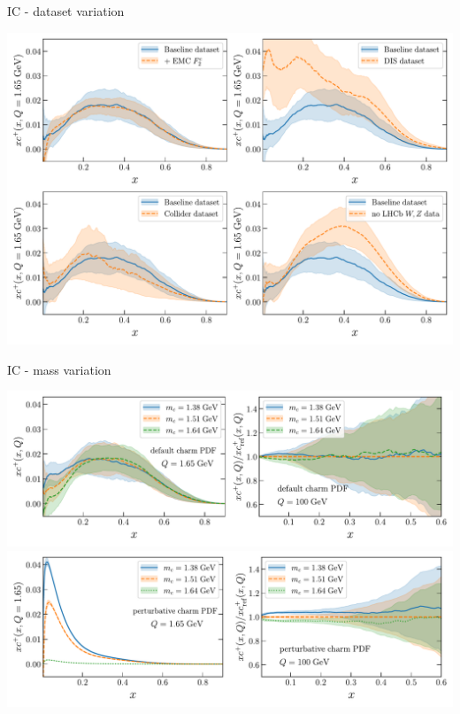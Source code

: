 \documentclass[9pt]{beamer}
\begin{document}
\begin{frame}{IC - dataset variation}
	\begin{center}
		\includegraphics[width=\linewidth]{pdfplot-abscharm-dataset_dep.pdf}
	\end{center}
\end{frame}
\begin{frame}{IC - mass variation}
	\begin{center}
		\includegraphics[width=\linewidth]{pdfplot-abscharm-mcdep.pdf}\\%
		\includegraphics[width=\linewidth]{pdfplot-abscharm-mcdep-highQ.pdf}
	\end{center}
\end{frame}
\end{document}
